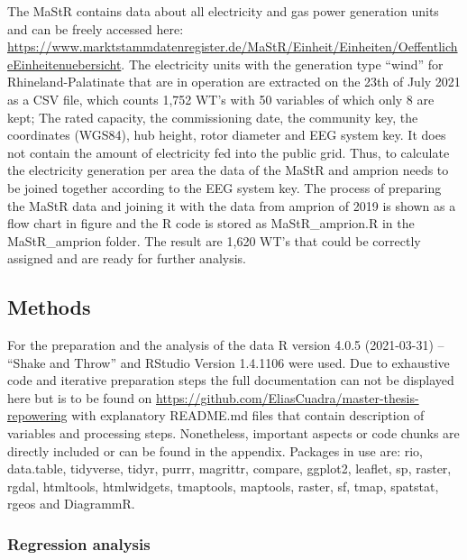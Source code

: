 \documentclass[a4paper,11pt]{article}
\begin{document}
The MaStR contains data about all electricity and gas power generation units and can be freely accessed here: \url{https://www.marktstammdatenregister.de/MaStR/Einheit/Einheiten/OeffentlicheEinheitenuebersicht}. The electricity units with the generation type ``wind'' for Rhineland-Palatinate that are in operation are extracted on the 23th of July 2021 as a CSV file, which counts 1,752 WT's with 50 variables of which only 8 are kept; The rated capacity, the commissioning date, the community key, the coordinates (WGS84), hub height, rotor diameter and EEG system key. It does not contain the amount of electricity fed into the public grid. Thus, to calculate the electricity generation per area the data of the MaStR and amprion needs to be joined together according to the EEG system key. The process of preparing the MaStR data and joining it with the data from amprion of 2019 is shown as a flow chart in figure and the R code is stored as MaStR\_amprion.R in the MaStR\_amprion folder. The result are 1,620 WT's that could be correctly assigned and are ready for further analysis.

\hypertarget{methods}{%
\subsection{Methods}\label{methods}}

For the preparation and the analysis of the data R version 4.0.5 (2021-03-31) -- ``Shake and Throw'' and RStudio Version 1.4.1106 were used. Due to exhaustive code and iterative preparation steps the full documentation can not be displayed here but is to be found on \url{https://github.com/EliasCuadra/master-thesis-repowering} with explanatory README.md files that contain description of variables and processing steps. Nonetheless, important aspects or code chunks are directly included or can be found in the appendix. Packages in use are: rio, data.table, tidyverse, tidyr, purrr, magrittr, compare, ggplot2, leaflet, sp, raster, rgdal, htmltools, htmlwidgets, tmaptools, maptools, raster, sf, tmap, spatstat, rgeos and DiagrammR.

\hypertarget{regression-analysis}{%
\subsubsection{Regression analysis}\label{regression-analysis}}
\end{document}
